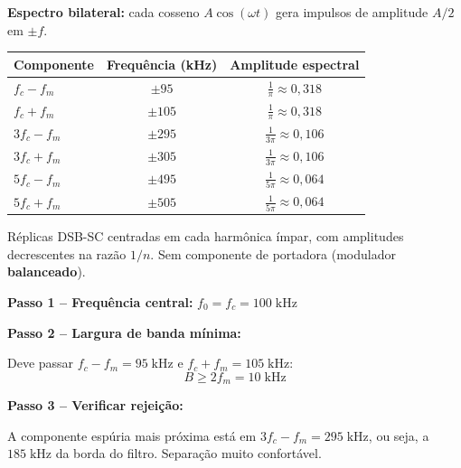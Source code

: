 \documentclass[11pt,a4paper]{article}
\begin{document}
\begin{resolucao}

\textbf{Espectro bilateral:} cada cosseno $A\cos(\omega t)$ gera impulsos de amplitude $A/2$ em $\pm f$.

\begin{center}
\small
\begin{tabular}{lcc}
  \toprule
  Componente & Frequência (kHz) & Amplitude espectral \\
  \midrule
  $f_c - f_m$ & $\pm 95$ & $\frac{1}{\pi} \approx 0{,}318$ \\[3pt]
  $f_c + f_m$ & $\pm 105$ & $\frac{1}{\pi} \approx 0{,}318$ \\[3pt]
  $3f_c - f_m$ & $\pm 295$ & $\frac{1}{3\pi} \approx 0{,}106$ \\[3pt]
  $3f_c + f_m$ & $\pm 305$ & $\frac{1}{3\pi} \approx 0{,}106$ \\[3pt]
  $5f_c - f_m$ & $\pm 495$ & $\frac{1}{5\pi} \approx 0{,}064$ \\[3pt]
  $5f_c + f_m$ & $\pm 505$ & $\frac{1}{5\pi} \approx 0{,}064$ \\
  \bottomrule
\end{tabular}
\end{center}

Réplicas DSB-SC centradas em cada harmônica ímpar, com amplitudes decrescentes na razão $1/n$. Sem componente de portadora (modulador \textbf{balanceado}).
\end{resolucao}

\begin{resolucao}

\textbf{Passo 1 -- Frequência central:} $f_0 = f_c = 100\;\text{kHz}$

\textbf{Passo 2 -- Largura de banda mínima:}

Deve passar $f_c - f_m = 95\;\text{kHz}$ e $f_c + f_m = 105\;\text{kHz}$:
\[
  \boxed{B \geq 2f_m = 10\;\text{kHz}}
\]

\textbf{Passo 3 -- Verificar rejeição:}

A componente espúria mais próxima está em $3f_c - f_m = 295\;\text{kHz}$, ou seja, a $185\;\text{kHz}$ da borda do filtro. Separação muito confortável.
\end{resolucao}
\end{document}
